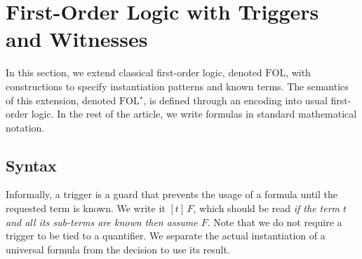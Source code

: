 \documentclass[]{easychair}
\newcommand{\FOL}{\mathrm{FOL}}
\newcommand{\FOLT}{\mathrm{FOL}^\star}
\newcommand{\ie}{{\em i.e.},\xspace}
\newcommand{\beforesec}{\vspace{0cm}}
\newcommand{\aftersec}{\vspace{0cm}}
\newcommand{\beforesub}{\vspace{0cm}}
\newcommand{\aftersub}{\vspace{0cm}}
\begin{document}
% 
% 
% 

\beforesec
\section{\label{labeled-calculus}First-Order Logic with Triggers and Witnesses}
\aftersec

In this section, we extend classical first-order logic, denoted
$\FOL$, with constructions to specify instantiation patterns and
known terms. The semantics of this extension, denoted $\FOLT$,
is defined through an encoding into usual first-order logic.
In the rest of the article, we write formulas in standard
mathematical notation.

\beforesub
\subsection{\label{syntax} Syntax}
\aftersub
Informally, a trigger is a guard that prevents the usage of a formula until
the requested term is known. We write it $[t]\,F$, which should be read
\emph{if the term $t$ and all its sub-terms are known then assume $F$}.
Note that we do not require a trigger
to be tied to a quantifier. We separate the actual instantiation of a
universal formula from the decision to use its result.
\end{document}
